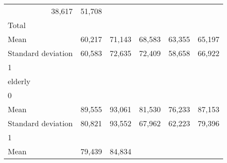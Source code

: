 \begin{tabular}{llllll}
  \multicolumn{1}{r}{38,617} &
  \multicolumn{1}{r}{51,708} \\
\multicolumn{1}{l}{\hspace{3em}Total} &
  \multicolumn{1}{|r}{} &
  \multicolumn{1}{r}{} &
  \multicolumn{1}{r}{} &
  \multicolumn{1}{r}{} &
  \multicolumn{1}{r}{} \\
\multicolumn{1}{l}{\hspace{4em}Mean} &
  \multicolumn{1}{|r}{60,217} &
  \multicolumn{1}{r}{71,143} &
  \multicolumn{1}{r}{68,583} &
  \multicolumn{1}{r}{63,355} &
  \multicolumn{1}{r}{65,197} \\
\multicolumn{1}{l}{\hspace{4em}Standard deviation} &
  \multicolumn{1}{|r}{60,583} &
  \multicolumn{1}{r}{72,635} &
  \multicolumn{1}{r}{72,409} &
  \multicolumn{1}{r}{58,658} &
  \multicolumn{1}{r}{66,922} \\
\multicolumn{1}{l}{\hspace{1em}1} &
  \multicolumn{1}{|r}{} &
  \multicolumn{1}{r}{} &
  \multicolumn{1}{r}{} &
  \multicolumn{1}{r}{} &
  \multicolumn{1}{r}{} \\
\multicolumn{1}{l}{\hspace{2em}elderly} &
  \multicolumn{1}{|r}{} &
  \multicolumn{1}{r}{} &
  \multicolumn{1}{r}{} &
  \multicolumn{1}{r}{} &
  \multicolumn{1}{r}{} \\
\multicolumn{1}{l}{\hspace{3em}0} &
  \multicolumn{1}{|r}{} &
  \multicolumn{1}{r}{} &
  \multicolumn{1}{r}{} &
  \multicolumn{1}{r}{} &
  \multicolumn{1}{r}{} \\
\multicolumn{1}{l}{\hspace{4em}Mean} &
  \multicolumn{1}{|r}{89,555} &
  \multicolumn{1}{r}{93,061} &
  \multicolumn{1}{r}{81,530} &
  \multicolumn{1}{r}{76,233} &
  \multicolumn{1}{r}{87,153} \\
\multicolumn{1}{l}{\hspace{4em}Standard deviation} &
  \multicolumn{1}{|r}{80,821} &
  \multicolumn{1}{r}{93,552} &
  \multicolumn{1}{r}{67,962} &
  \multicolumn{1}{r}{62,223} &
  \multicolumn{1}{r}{79,396} \\
\multicolumn{1}{l}{\hspace{3em}1} &
  \multicolumn{1}{|r}{} &
  \multicolumn{1}{r}{} &
  \multicolumn{1}{r}{} &
  \multicolumn{1}{r}{} &
  \multicolumn{1}{r}{} \\
\multicolumn{1}{l}{\hspace{4em}Mean} &
  \multicolumn{1}{|r}{79,439} &
  \multicolumn{1}{r}{84,834} &

\end{tabular}
